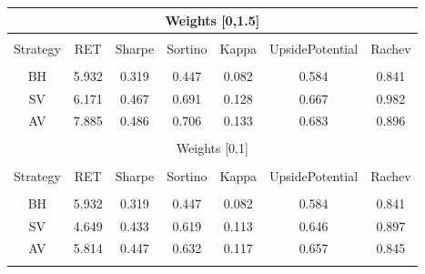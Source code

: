 
\begin{tabular}{@{\extracolsep{5pt}} ccccccc} 
\multicolumn{7}{c}{Weights [0,1.5]}\\
\hline \\[-1.8ex] 
 Strategy & RET & Sharpe & Sortino & Kappa & UpsidePotential & Rachev \\ 
\hline \\[-1.8ex] 
BH & 5.932 & 0.319 & 0.447 & 0.082 & 0.584 & 0.841 \\ 
 SV & 6.171 & 0.467 & 0.691 & 0.128 & 0.667 & 0.982 \\ 
 AV & 7.885 & 0.486 & 0.706 & 0.133 & 0.683 & 0.896 \\ 
 \hline\\
 \multicolumn{7}{c}{Weights [0,1]}\\
 \hline\\
 Strategy & RET & Sharpe & Sortino & Kappa & UpsidePotential & Rachev \\ 
 \hline \\[-1.8ex] 
 BH & 5.932 & 0.319 & 0.447 & 0.082 & 0.584 & 0.841 \\ 
 SV & 4.649 & 0.433 & 0.619 & 0.113 & 0.646 & 0.897 \\ 
 AV & 5.814 & 0.447 & 0.632 & 0.117 & 0.657 & 0.845 \\ 
\hline \\[-1.8ex] 
\end{tabular} 
